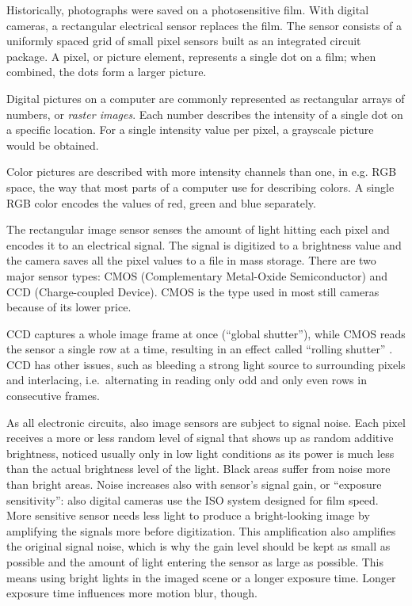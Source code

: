 
Historically, photographs were saved on a photosensitive film.
With digital cameras, a rectangular electrical sensor replaces the film.
The sensor consists of a uniformly spaced grid of small pixel sensors built as an integrated circuit package.
A pixel, or picture element, represents a single dot on a film; when combined, the dots form a larger picture.


Digital pictures on a computer are commonly represented as rectangular arrays of numbers, or \emph{raster images}.
Each number describes the intensity of a single dot on a specific location.
For a single intensity value per pixel, a grayscale picture would be obtained.

Color pictures are described with more intensity channels than one, in e.g. RGB space, the way that most parts of a computer use for describing colors.
A single RGB color encodes the values of red, green and blue separately.


The rectangular image sensor senses the amount of light hitting each pixel and encodes it to an electrical signal.
The signal is digitized to a brightness value and the camera saves all the pixel values to a file in mass storage.
There are two major sensor types: CMOS (Complementary Metal-Oxide Semiconductor) and CCD (Charge-coupled Device).
CMOS is the type used in most still cameras because of its lower price.

CCD captures a whole image frame at once (``global shutter''), while CMOS reads the sensor a single row at a time, resulting in an effect called ``rolling shutter'' \cite{todo:cmos}.
CCD has other issues, such as bleeding a strong light source to surrounding pixels and interlacing, i.e.~alternating in reading only odd and only even rows in consecutive frames.


As all electronic circuits, also image sensors are subject to signal noise.
Each pixel receives a more or less random level of signal that shows up as random additive brightness, noticed usually only in low light conditions as its power is much less than the actual brightness level of the light.
Black areas suffer from noise more than bright areas.
Noise increases also with sensor's signal gain, or ``exposure sensitivity'': also digital cameras use the ISO system designed for film speed.
More sensitive sensor needs less light to produce a bright-looking image by amplifying the signals more before digitization.
This amplification also amplifies the original signal noise, which is why the gain level should be kept as small as possible and the amount of light entering the sensor as large as possible.
This means using bright lights in the imaged scene or a longer exposure time.
Longer exposure time influences more motion blur, though.

